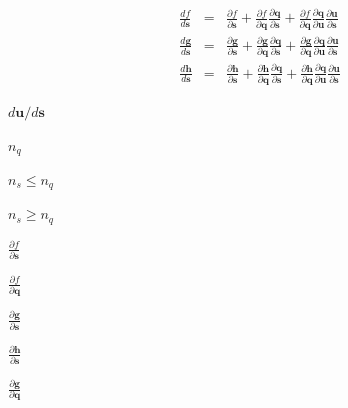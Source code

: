 \documentclass{article}
\begin{document}
\begin{eqnarray*}
\frac {df}{ d \mathbf s} & = & \frac {\partial f}{\partial \mathbf s} +
                               \frac {\partial f}{\partial \mathbf q}
                               \frac {\partial \mathbf q}{\partial \mathbf s} +
                               \frac {\partial f}{\partial \mathbf q}
                               \frac {\partial \mathbf q}{\partial \mathbf u}
                               \frac {\partial \mathbf u}{\partial \mathbf s} \\
                           
\frac {d \mathbf g}{ d \mathbf s} & = & \frac {\partial \mathbf g }{\partial \mathbf s} +
                                        \frac {\partial \mathbf g }{\partial \mathbf q}
                                        \frac {\partial \mathbf q}{\partial \mathbf s} +
                                        \frac {\partial \mathbf g }{\partial \mathbf q}
                                        \frac {\partial \mathbf q}{\partial \mathbf u}
                                        \frac {\partial \mathbf u}{\partial \mathbf s} \\

\frac {d \mathbf h}{ d \mathbf s} & = & \frac {\partial \mathbf h }{\partial \mathbf s} +
                                        \frac {\partial \mathbf h }{\partial \mathbf q}
                                        \frac {\partial \mathbf q}{\partial \mathbf s} +
                                        \frac {\partial \mathbf h }{\partial \mathbf q}
                                        \frac {\partial \mathbf q}{\partial \mathbf u}
                                        \frac {\partial \mathbf u}{\partial \mathbf s}
\end{eqnarray*}
\pagebreak

$ d \mathbf u / d \mathbf s $
\pagebreak

$ n_q $
\pagebreak

$ n_s \le n_q $
\pagebreak

$ n_s \ge n_q $
\pagebreak

$ \frac {\partial f}{\partial \mathbf s} $
\pagebreak

$ \frac {\partial f}{\partial \mathbf q} $
\pagebreak

$ \frac {\partial \mathbf g }{\partial \mathbf s} $
\pagebreak

$ \frac {\partial \mathbf h }{\partial \mathbf s} $
\pagebreak

$ \frac {\partial \mathbf g }{\partial \mathbf q} $
\pagebreak
\end{document}
